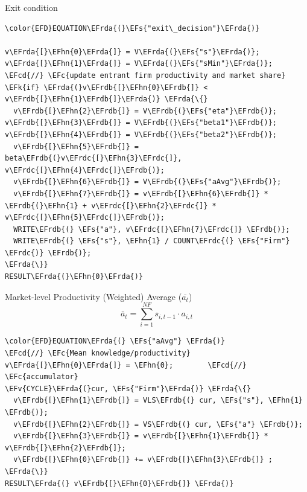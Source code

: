 \documentclass[bigger,aspectratio=169]{beamer}
\newcommand{\EFc}[1]{\textcolor{EFc}{#1}} %
\newcommand{\EFcd}[1]{\textcolor{EFcd}{#1}} %
\newcommand{\EFs}[1]{\textcolor{EFs}{#1}} %
\newcommand{\EFk}[1]{\textcolor{EFk}{#1}} %
\newcommand{\EFv}[1]{\textcolor{EFv}{#1}} %
\newcommand{\EFhn}[1]{\textcolor{EFhn}{\textbf{#1}}} %
\newcommand{\EFrda}[1]{\textcolor{EFrda}{#1}} %
\newcommand{\EFrdb}[1]{\textcolor{EFrdb}{#1}} %
\newcommand{\EFrdc}[1]{\textcolor{EFrdc}{#1}} %
\begin{document}
\begin{frame}[label={sec:org07962bf},fragile]{Exit condition}
 \begin{Code}
\begin{Verbatim}
\color{EFD}EQUATION\EFrda{(}\EFs{"exit\_decision"}\EFrda{)}

v\EFrda{[}\EFhn{0}\EFrda{]} = V\EFrda{(}\EFs{"s"}\EFrda{)}; v\EFrda{[}\EFhn{1}\EFrda{]} = V\EFrda{(}\EFs{"sMin"}\EFrda{)};
\EFcd{//} \EFc{update entrant firm productivity and market share}
\EFk{if} \EFrda{(}v\EFrdb{[}\EFhn{0}\EFrdb{]} < v\EFrdb{[}\EFhn{1}\EFrdb{]}\EFrda{)} \EFrda{\{}
  v\EFrdb{[}\EFhn{2}\EFrdb{]} = V\EFrdb{(}\EFs{"eta"}\EFrdb{)}; v\EFrdb{[}\EFhn{3}\EFrdb{]} = V\EFrdb{(}\EFs{"beta1"}\EFrdb{)}; v\EFrdb{[}\EFhn{4}\EFrdb{]} = V\EFrdb{(}\EFs{"beta2"}\EFrdb{)};
  v\EFrdb{[}\EFhn{5}\EFrdb{]} = beta\EFrdb{(}v\EFrdc{[}\EFhn{3}\EFrdc{]}, v\EFrdc{[}\EFhn{4}\EFrdc{]}\EFrdb{)};
  v\EFrdb{[}\EFhn{6}\EFrdb{]} = V\EFrdb{(}\EFs{"aAvg"}\EFrdb{)};
  v\EFrdb{[}\EFhn{7}\EFrdb{]} = v\EFrdb{[}\EFhn{6}\EFrdb{]} * \EFrdb{(}\EFhn{1} + v\EFrdc{[}\EFhn{2}\EFrdc{]} * v\EFrdc{[}\EFhn{5}\EFrdc{]}\EFrdb{)};
  WRITE\EFrdb{(} \EFs{"a"}, v\EFrdc{[}\EFhn{7}\EFrdc{]} \EFrdb{)};
  WRITE\EFrdb{(} \EFs{"s"}, \EFhn{1} / COUNT\EFrdc{(} \EFs{"Firm"} \EFrdc{)} \EFrdb{)};
\EFrda{\}}
RESULT\EFrda{(}\EFhn{0}\EFrda{)}
\end{Verbatim}
\end{Code}
\end{frame}
\begin{frame}[label={sec:org43205e4},fragile]{Market-level Productivity (Weighted) Average (\(\bar{a_{t}}\))}
 \begin{equation}
\bar{a}_{t} =  \sum_{i=1}^{NF} s_{i, t-1}\cdot a_{i,t}
\end{equation}


\begin{Code}
\begin{Verbatim}
\color{EFD}EQUATION\EFrda{(} \EFs{"aAvg"} \EFrda{)}
\EFcd{//} \EFc{Mean knowledge/productivity}
v\EFrda{[}\EFhn{0}\EFrda{]} = \EFhn{0};        \EFcd{//} \EFc{accumulator}
\EFv{CYCLE}\EFrda{(}cur, \EFs{"Firm"}\EFrda{)} \EFrda{\{}
  v\EFrdb{[}\EFhn{1}\EFrdb{]} = VLS\EFrdb{(} cur, \EFs{"s"}, \EFhn{1} \EFrdb{)};
  v\EFrdb{[}\EFhn{2}\EFrdb{]} = VS\EFrdb{(} cur, \EFs{"a"} \EFrdb{)};
  v\EFrdb{[}\EFhn{3}\EFrdb{]} = v\EFrdb{[}\EFhn{1}\EFrdb{]} * v\EFrdb{[}\EFhn{2}\EFrdb{]};
  v\EFrdb{[}\EFhn{0}\EFrdb{]} += v\EFrdb{[}\EFhn{3}\EFrdb{]} ;
\EFrda{\}}
RESULT\EFrda{(} v\EFrdb{[}\EFhn{0}\EFrdb{]} \EFrda{)}
\end{Verbatim}
\end{Code}
\end{frame}
\end{document}
